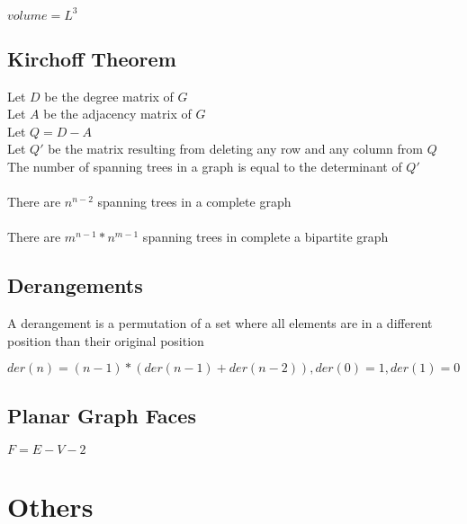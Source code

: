 \documentclass[8pt, oneside]{extarticle}
\begin{document}
\begin{multicols}{3}
$volume = L^3$

\subsection{Kirchoff Theorem}
Let $D$ be the degree matrix of $G$\\
Let $A$ be the adjacency matrix of $G$\\
Let $Q = D - A$\\
Let $Q'$ be the matrix resulting from deleting any row and any column from $Q$\\
The number of spanning trees in a graph is equal to the determinant of $Q'$\\
\\
There are $n^{n-2}$ spanning trees in a complete graph\\
\\
There are $m^{n-1}*n^{m-1}$ spanning trees in complete a bipartite graph

\subsection{Derangements}

A derangement is a permutation of a set where all elements are in a different position than their original position

$der(n) = (n-1)*(der(n-1)+der(n-2)), der(0) = 1, der(1) = 0$

\subsection{Planar Graph Faces}

$F = E - V - 2$

\section{Others}

\end{multicols}
\end{document}
